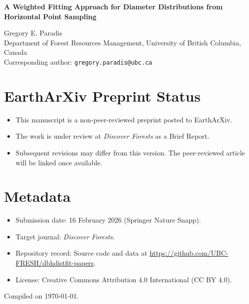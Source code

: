 \documentclass[12pt]{article}
\begin{document}
\thispagestyle{empty}

{\LARGE\bfseries A Weighted Fitting Approach for Diameter Distributions from Horizontal Point Sampling\par}

{\large Gregory E. Paradis\\Department of Forest Resources Management, University of British Columbia, Canada\\Corresponding author: \texttt{gregory.paradis@ubc.ca}\par}

\section*{EarthArXiv Preprint Status}
\begin{itemize}[leftmargin=*]
  \item This manuscript is a non-peer-reviewed preprint posted to EarthArXiv.
  \item The work is under review at \emph{Discover Forests} as a Brief Report.
  \item Subsequent revisions may differ from this version. The peer-reviewed article will be linked once available.
\end{itemize}

\section*{Metadata}
\begin{itemize}[leftmargin=*]
  \item Submission date: 16 February 2026 (Springer Nature Snapp).
  \item Target journal: \emph{Discover Forests}.
  \item Repository record: Source code and data at \url{https://github.com/UBC-FRESH/dbhdistfit-papers}.
  \item License: Creative Commons Attribution 4.0 International (CC BY 4.0).
\end{itemize}

\vfill
Compiled on \today.

\clearpage

\end{document}
